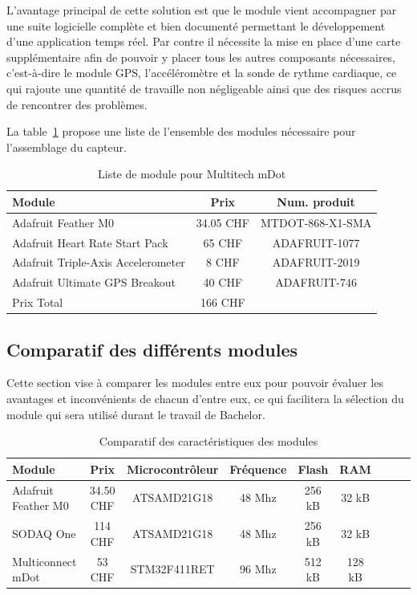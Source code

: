 L’avantage principal de cette solution est que le module vient accompagner par une suite logicielle complète et bien documenté permettant le développement d’une application temps réel. Par contre il nécessite la mise en place d’une carte supplémentaire afin de pouvoir y placer tous les autres composants nécessaires, c’est-à-dire le module GPS, l’accéléromètre et la sonde de rythme cardiaque, ce qui rajoute une quantité de travaille non négligeable ainsi que des risques accrus de rencontrer des problèmes.

La table~\ref{tab:mdot_liste} propose une liste de l'ensemble des modules nécessaire pour l'assemblage du capteur.

\begin{table}[htb]
\caption[Liste de module pour Multitech mDot]{Liste de module pour Multitech mDot}
\label{tab:mdot_liste}
\centering
\begin{tabular}{lcc}
\toprule
Module & Prix & Num. produit \\ 
\midrule
Adafruit Feather M0 & 34.05 CHF & MTDOT-868-X1-SMA \\
Adafruit Heart Rate Start Pack & 65 CHF & ADAFRUIT-1077 \\
Adafruit Triple-Axis Accelerometer & 8 CHF & ADAFRUIT-2019 \\
Adafruit Ultimate GPS Breakout & 40 CHF & ADAFRUIT-746 \\
\midrule
Prix Total & 166 CHF &  \\
\bottomrule 
\end{tabular}
\end{table}

\subsection{Comparatif des différents modules}

Cette section vise à comparer les modules entre eux pour pouvoir évaluer les avantages et inconvénients de chacun d’entre eux, ce qui facilitera la sélection du module qui sera utilisé durant le travail de Bachelor.

\begin{table}[htb]
\caption[Comparatif des caractéristiques des modules]{Comparatif des caractéristiques des modules}
\label{tab:comparatif_micro}
\centering
\begin{tabular}{lcccccccc}
\toprule
Module & Prix & Microcontrôleur & Fréquence & Flash & RAM  \\ 
\midrule
Adafruit Feather M0	& 34.50 CHF	& ATSAMD21G18 & 48 Mhz & 256 kB & 32 kB & \\
SODAQ One	& 114 CHF & ATSAMD21G18 & 48 Mhz & 256 kB & 32 kB \\
Multiconnect mDot & 53 CHF & STM32F411RET & 96 Mhz & 512 kB & 128 kB \\
\bottomrule 
\end{tabular}
\end{table}

